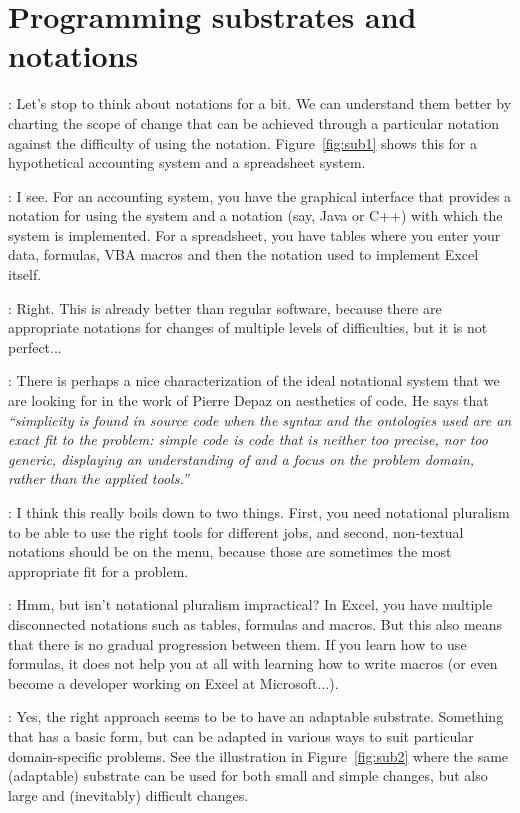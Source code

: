 \documentclass[runningheads]{llncs}
\newcommand{\T}{Tomas}
\newcommand{\J}{Joel}
\newcommand{\says}[2][gg]{\vspace{0.5em}\noindent\hangindent=0.5cm{\textsc{#1}}: #2}
\begin{document}
\section{Programming substrates and notations}

\says[\J]{Let's stop to think about notations for a bit. We can understand them better by charting the scope of change that can be achieved through a particular notation against the difficulty of using the notation. Figure~\ref{fig:sub1} shows this for a hypothetical accounting system and a spreadsheet system.}

\says[\T]{I see. For an accounting system, you have the graphical interface that provides a notation for using the system and a notation (say, Java or C++) with which the system is implemented. For a spreadsheet, you have tables where you enter your data, formulas, VBA macros and then the notation used to implement Excel itself.}

\says[\J]{Right. This is already better than regular software, because there are appropriate notations for changes of multiple levels of difficulties, but it is not perfect...}

\says[\T]{There is perhaps a nice characterization of the ideal notational system that we are looking for in the work of Pierre Depaz \cite[p.123]{depaz-2023-aesthetics} on aesthetics of code. He says that \emph{``simplicity is found in source code when the syntax and the ontologies used are an exact fit to the problem: simple code is code that is neither too precise, nor too generic, displaying an understanding of and a focus on the problem domain, rather than the applied tools.''}}

\says[\J]{I think this really boils down to two things. First, you need notational pluralism to be able to use the right tools for different jobs, and second, non-textual notations should be on the menu, because those are sometimes the most appropriate fit for a problem.}

\says[\T]{Hmm, but isn't notational pluralism impractical? In Excel, you have multiple disconnected notations such as tables, formulas and macros. But this also means that there is no gradual progression between them. If you learn how to use formulas, it does not help you at all with learning how to write macros (or even become a developer working on Excel at Microsoft...).}

\says[\J]{Yes, the right approach seems to be to have an adaptable substrate. Something that has a basic form, but can be adapted in various ways to suit particular domain-specific problems. See the illustration in Figure~\ref{fig:sub2} where the same (adaptable) substrate can be used for both small and simple changes, but also large and (inevitably) difficult changes.}
\end{document}
